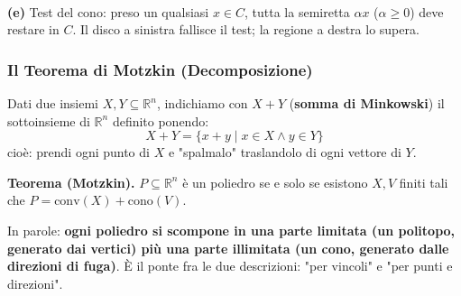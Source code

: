 \documentclass[12pt]{extarticle} %
\begin{document}
\begin{center}
\begin{minipage}{0.9\linewidth}\centering
{}
\\[2pt]\small \textbf{(e)} Test del cono: preso un qualsiasi $x \in C$, tutta la semiretta $\alpha x$ ($\alpha \ge 0$) deve restare in $C$. Il disco a sinistra fallisce il test; la regione a destra lo supera.
\end{minipage}
\end{center}

\subsubsection{Il Teorema di Motzkin (Decomposizione)}
Dati due insiemi $X, Y \subseteq \mathbb{R}^n$, indichiamo con $X+Y$ (\textbf{somma di Minkowski}) il sottoinsieme di $\mathbb{R}^n$ definito ponendo:
\[ X+Y = \{x+y \mid x \in X \wedge y \in Y\} \]
cioè: prendi ogni punto di $X$ e "spalmalo" traslandolo di ogni vettore di $Y$.

\noindent\textbf{Teorema (Motzkin).} $P \subseteq \mathbb{R}^n$ è un poliedro se e solo se esistono $X, V$ finiti tali che $P = \text{conv}(X) + \text{cono}(V)$.

\medskip
\noindent In parole: \textbf{ogni poliedro si scompone in una parte limitata (un politopo, generato dai vertici) più una parte illimitata (un cono, generato dalle direzioni di fuga)}. È il ponte fra le due descrizioni: "per vincoli" e "per punti e direzioni".
\end{document}
